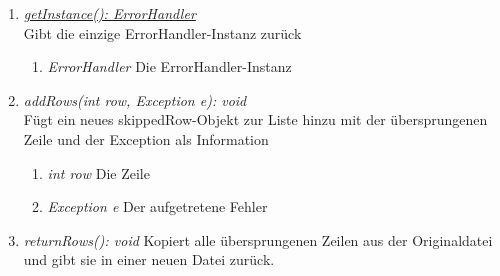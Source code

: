 \begin{enumerate}[+]
	\item \underline{\textit{getInstance(): ErrorHandler}} \\
	Gibt die einzige ErrorHandler-Instanz zurück
	\begin{enumerate}[$\circ$]
 		\item \textit{ErrorHandler} Die ErrorHandler-Instanz
	\end{enumerate}

	\item \textit{addRows(int row, Exception e): void} \\
	Fügt ein neues skippedRow-Objekt zur Liste hinzu mit der übersprungenen Zeile und der Exception als Information 
	\begin{enumerate}[$\bullet$]
		\item \textit{int row} Die Zeile
		\item \textit{Exception e} Der aufgetretene Fehler
	\end{enumerate}

	\item \textit{returnRows(): void} Kopiert alle übersprungenen Zeilen aus der Originaldatei und gibt sie in einer neuen Datei zurück.
\end{enumerate}


